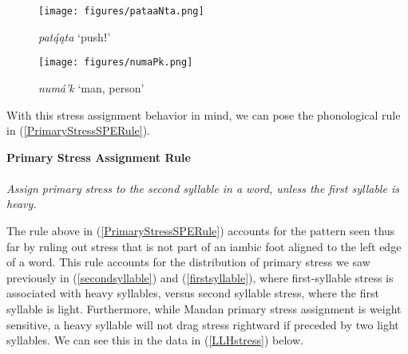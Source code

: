 \begin{figure}
\caption{\textit{patą́ąta} `pushǃ'}\label{pataaNta}
\texttt{[image: figures/pataaNta.png]}
\end{figure}
\begin{figure}
\caption{\textit{numá'k} `man, person'}\label{numaPk}
\texttt{[image: figures/numaPk.png]}
\end{figure}

With this stress assignment behavior in mind, we can pose the phonological rule in (\ref{PrimaryStressSPERule}).

\begin{exe}

\item\label{PrimaryStressSPERule} \textbf{Primary Stress Assignment Rule}\\
	\\
	\textit{Assign primary stress to the second syllable in a word, unless the first syllable is heavy.}

\end{exe}

The rule above in (\ref{PrimaryStressSPERule}) accounts for the pattern seen thus far by ruling out stress that is not part of an iambic foot aligned to the left edge of a word. This rule accounts for the distribution of primary stress we saw previously in (\ref{secondsyllable}) and (\ref{firstsyllable}), where first-syllable stress is associated with heavy syllables, versus second syllable stress, where the first syllable is light. Furthermore, while Mandan primary stress assignment is weight sensitive, a heavy syllable will not drag stress rightward if preceded by two light syllables. We can see this in the data in (\ref{LLHstress}) below.


